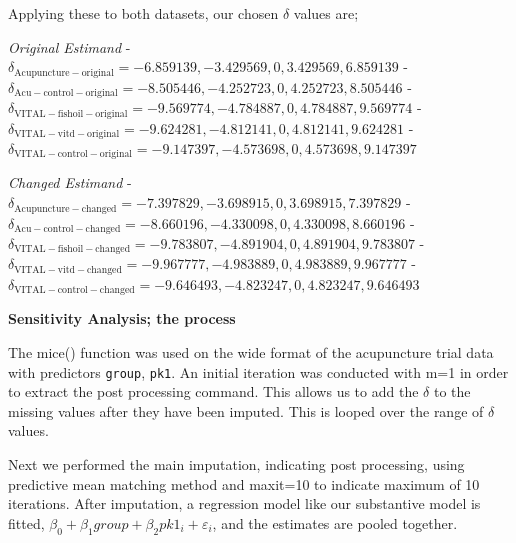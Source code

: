 \documentclass{article}
\begin{document}
Applying these to both datasets, our chosen \(\delta\) values are;

\emph{Original Estimand} -
\(\delta_\mathrm{Acupuncture-original} = -6.859139,-3.429569,0,3.429569,6.859139\)
-
\(\delta_\mathrm{Acu-control-original} = -8.505446,-4.252723,0,4.252723,8.505446\)
-
\(\delta_\mathrm{VITAL-fishoil-original} = -9.569774,-4.784887,0,4.784887,9.569774\)
-
\(\delta_\mathrm{VITAL-vitd-original} = -9.624281,-4.812141,0,4.812141,9.624281\)
-
\(\delta_\mathrm{VITAL-control-original} = -9.147397,-4.573698,0,4.573698,9.147397\)

\emph{Changed Estimand} -
\(\delta_\mathrm{Acupuncture-changed} = -7.397829,-3.698915,0,3.698915,7.397829\)
-
\(\delta_\mathrm{Acu-control-changed} = -8.660196,-4.330098,0, 4.330098,8.660196\)
-
\(\delta_\mathrm{VITAL-fishoil-changed} = -9.783807,-4.891904,0,4.891904,9.783807\)
-
\(\delta_\mathrm{VITAL-vitd-changed} = -9.967777,-4.983889,0,4.983889,9.967777\)
-
\(\delta_\mathrm{VITAL-control-changed} = -9.646493,-4.823247,0, 4.823247,9.646493\)

\textbf{Sensitivity Analysis; the process}

The mice() function was used on the wide format of the acupuncture trial
data with predictors \texttt{group}, \texttt{pk1}. An initial iteration
was conducted with m=1 in order to extract the post processing command.
This allows us to add the \(\delta\) to the missing values after they
have been imputed. This is looped over the range of \(\delta\) values.

Next we performed the main imputation, indicating post processing, using
predictive mean matching method and maxit=10 to indicate maximum of 10
iterations. After imputation, a regression model like our substantive
model is fitted, \(\beta_0 + \beta_1group+\beta_2pk1_i+\varepsilon_i\),
and the estimates are pooled together.

\newpage
\end{document}
